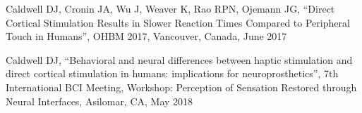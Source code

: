 \noindent Caldwell DJ, Cronin JA, Wu J, Weaver K, Rao RPN, Ojemann JG, “Direct Cortical Stimulation Results in Slower Reaction Times Compared to Peripheral Touch in Humans”, OHBM 2017, Vancouver, Canada, June 2017 
\medskip

\noindent Caldwell DJ, “Behavioral and neural differences between haptic stimulation and direct cortical stimulation in humans: implications for neuroprosthetics”, 7th International BCI Meeting, Workshop: Perception of Sensation Restored through Neural Interfaces, Asilomar, CA, May 2018 
\medskip


